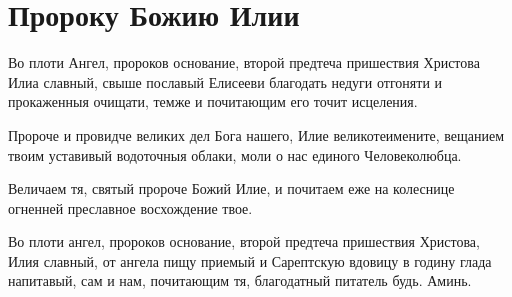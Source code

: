 \mychapterending


 

\section{Пророку Божию Илии}\begin{mymulticols}
 


Во плоти Ангел, пророков основание, второй предтеча пришествия Христова Илиа славный, свыше пославый Елисееви благодать недуги отгоняти и прокаженныя очищати, темже и почитающим его точит исцеления.


Пророче и провидче великих дел Бога нашего, Илие великотеимените, вещанием твоим уставивый водоточныя облаки, моли о нас единого Человеколюбца.


Величаем тя, святый пророче Божий Илие, и почитаем еже на колеснице огненней преславное восхождение твое.


Во плоти ангел, пророков основание, второй предтеча пришествия Христова, Илия славный, от ангела пищу приемый и Сарептскую вдовицу в годину глада напитавый, сам и нам, почитающим тя, благодатный питатель будь. Аминь.

\end{mymulticols}

